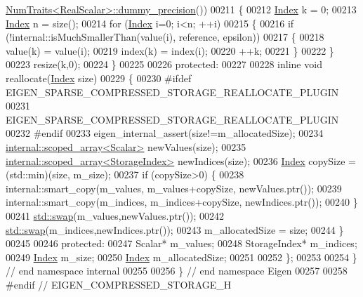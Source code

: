 \begin{DoxyCode}
      \hyperlink{group___core___module_struct_eigen_1_1_num_traits}{NumTraits<RealScalar>::dummy\_precision}())
00211     \{
00212       \hyperlink{namespace_eigen_a62e77e0933482dafde8fe197d9a2cfde}{Index} k = 0;
00213       \hyperlink{namespace_eigen_a62e77e0933482dafde8fe197d9a2cfde}{Index} n = size();
00214       \textcolor{keywordflow}{for} (\hyperlink{namespace_eigen_a62e77e0933482dafde8fe197d9a2cfde}{Index} i=0; i<n; ++i)
00215       \{
00216         \textcolor{keywordflow}{if} (!internal::isMuchSmallerThan(value(i), reference, epsilon))
00217         \{
00218           value(k) = value(i);
00219           index(k) = index(i);
00220           ++k;
00221         \}
00222       \}
00223       resize(k,0);
00224     \}
00225 
00226   \textcolor{keyword}{protected}:
00227 
00228     \textcolor{keyword}{inline} \textcolor{keywordtype}{void} reallocate(\hyperlink{namespace_eigen_a62e77e0933482dafde8fe197d9a2cfde}{Index} size)
00229     \{
00230 \textcolor{preprocessor}{      #ifdef EIGEN\_SPARSE\_COMPRESSED\_STORAGE\_REALLOCATE\_PLUGIN}
00231         EIGEN\_SPARSE\_COMPRESSED\_STORAGE\_REALLOCATE\_PLUGIN
00232 \textcolor{preprocessor}{      #endif}
00233       eigen\_internal\_assert(size!=m\_allocatedSize);
00234       \hyperlink{class_eigen_1_1internal_1_1scoped__array}{internal::scoped\_array<Scalar>} newValues(size);
00235       \hyperlink{class_eigen_1_1internal_1_1scoped__array}{internal::scoped\_array<StorageIndex>} newIndices(size);
00236       \hyperlink{namespace_eigen_a62e77e0933482dafde8fe197d9a2cfde}{Index} copySize = (std::min)(size, m\_size);
00237       \textcolor{keywordflow}{if} (copySize>0) \{
00238         internal::smart\_copy(m\_values, m\_values+copySize, newValues.ptr());
00239         internal::smart\_copy(m\_indices, m\_indices+copySize, newIndices.ptr());
00240       \}
00241       \hyperlink{endian_8c_a3ca5ecd34b04d6a243c054ac3a57f68d}{std::swap}(m\_values,newValues.ptr());
00242       \hyperlink{endian_8c_a3ca5ecd34b04d6a243c054ac3a57f68d}{std::swap}(m\_indices,newIndices.ptr());
00243       m\_allocatedSize = size;
00244     \}
00245 
00246   \textcolor{keyword}{protected}:
00247     Scalar* m\_values;
00248     StorageIndex* m\_indices;
00249     \hyperlink{namespace_eigen_a62e77e0933482dafde8fe197d9a2cfde}{Index} m\_size;
00250     \hyperlink{namespace_eigen_a62e77e0933482dafde8fe197d9a2cfde}{Index} m\_allocatedSize;
00251 
00252 \};
00253 
00254 \} \textcolor{comment}{// end namespace internal}
00255 
00256 \} \textcolor{comment}{// end namespace Eigen}
00257 
00258 \textcolor{preprocessor}{#endif // EIGEN\_COMPRESSED\_STORAGE\_H}
\end{DoxyCode}
